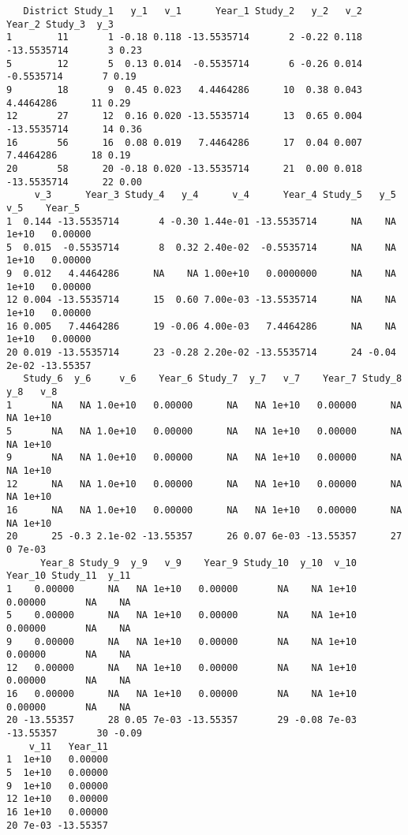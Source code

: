 \documentclass[11pt]{article}
\begin{document}
\begin{verbatim}
   District Study_1   y_1   v_1      Year_1 Study_2   y_2   v_2      Year_2 Study_3  y_3
1        11       1 -0.18 0.118 -13.5535714       2 -0.22 0.118 -13.5535714       3 0.23
5        12       5  0.13 0.014  -0.5535714       6 -0.26 0.014  -0.5535714       7 0.19
9        18       9  0.45 0.023   4.4464286      10  0.38 0.043   4.4464286      11 0.29
12       27      12  0.16 0.020 -13.5535714      13  0.65 0.004 -13.5535714      14 0.36
16       56      16  0.08 0.019   7.4464286      17  0.04 0.007   7.4464286      18 0.19
20       58      20 -0.18 0.020 -13.5535714      21  0.00 0.018 -13.5535714      22 0.00
     v_3      Year_3 Study_4   y_4      v_4      Year_4 Study_5   y_5   v_5    Year_5
1  0.144 -13.5535714       4 -0.30 1.44e-01 -13.5535714      NA    NA 1e+10   0.00000
5  0.015  -0.5535714       8  0.32 2.40e-02  -0.5535714      NA    NA 1e+10   0.00000
9  0.012   4.4464286      NA    NA 1.00e+10   0.0000000      NA    NA 1e+10   0.00000
12 0.004 -13.5535714      15  0.60 7.00e-03 -13.5535714      NA    NA 1e+10   0.00000
16 0.005   7.4464286      19 -0.06 4.00e-03   7.4464286      NA    NA 1e+10   0.00000
20 0.019 -13.5535714      23 -0.28 2.20e-02 -13.5535714      24 -0.04 2e-02 -13.55357
   Study_6  y_6     v_6    Year_6 Study_7  y_7   v_7    Year_7 Study_8 y_8   v_8
1       NA   NA 1.0e+10   0.00000      NA   NA 1e+10   0.00000      NA  NA 1e+10
5       NA   NA 1.0e+10   0.00000      NA   NA 1e+10   0.00000      NA  NA 1e+10
9       NA   NA 1.0e+10   0.00000      NA   NA 1e+10   0.00000      NA  NA 1e+10
12      NA   NA 1.0e+10   0.00000      NA   NA 1e+10   0.00000      NA  NA 1e+10
16      NA   NA 1.0e+10   0.00000      NA   NA 1e+10   0.00000      NA  NA 1e+10
20      25 -0.3 2.1e-02 -13.55357      26 0.07 6e-03 -13.55357      27   0 7e-03
      Year_8 Study_9  y_9   v_9    Year_9 Study_10  y_10  v_10   Year_10 Study_11  y_11
1    0.00000      NA   NA 1e+10   0.00000       NA    NA 1e+10   0.00000       NA    NA
5    0.00000      NA   NA 1e+10   0.00000       NA    NA 1e+10   0.00000       NA    NA
9    0.00000      NA   NA 1e+10   0.00000       NA    NA 1e+10   0.00000       NA    NA
12   0.00000      NA   NA 1e+10   0.00000       NA    NA 1e+10   0.00000       NA    NA
16   0.00000      NA   NA 1e+10   0.00000       NA    NA 1e+10   0.00000       NA    NA
20 -13.55357      28 0.05 7e-03 -13.55357       29 -0.08 7e-03 -13.55357       30 -0.09
    v_11   Year_11
1  1e+10   0.00000
5  1e+10   0.00000
9  1e+10   0.00000
12 1e+10   0.00000
16 1e+10   0.00000
20 7e-03 -13.55357
\end{verbatim}
\end{document}
